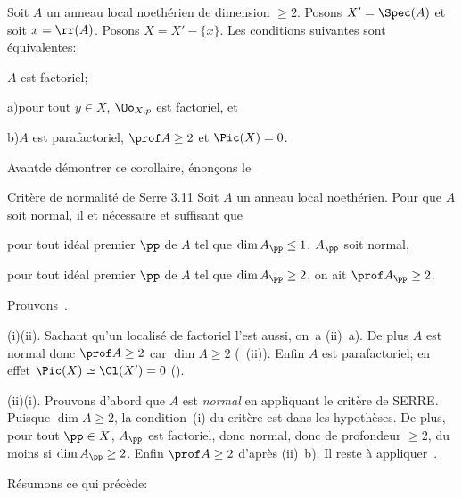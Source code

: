 \begin{corollaire} \label{XI.3.10}
Soit $A$ un anneau local noeth\'erien de dimension $\geq 2$. Posons $X'=\Spec(A)$ et soit $x = \rr(A)$. Posons $X=X'-\{x\}$. Les conditions suivantes sont \'equivalentes:
\begin{enumeratei}
\item
$A$ est factoriel;
\item
\textup{a)}\enspace pour tout $y\in X$, $\Oo_{X, p}$ est factoriel, et
\par\hspace*{6.3mm}\textup{b)}\enspace $A$ est parafactoriel, \ie $\prof A\geq 2$ et $\Pic(X)=0$.
\end{enumeratei}
\end{corollaire}

Avant\pageoriginale de d\'emontrer ce corollaire, \'enon\c cons le
\label{XI.3.11}
\begin{enonce*}{Crit\`ere de normalit\'e de Serre 3.11\sfootnotemark} Soit $A$ un anneau local noeth\'erien. Pour que $A$ soit normal, il et n\'ecessaire et suffisant que
\begin{enumeratei}
\item
pour tout id\'eal premier ${\pp}$ de $A$ tel que $\dim A_{{\pp}}\leq 1$, $A_{{\pp}}$ soit normal,
\item
pour tout id\'eal premier ${\pp}$ de $A$ tel que $\dim A_{{\pp}}\geq 2$, on ait $\prof A_{{\pp}}\geq 2$.
\end{enumeratei}
\end{enonce*}

Prouvons~.

(i)\ALORS (ii). Sachant qu'un localis\'e de factoriel l'est aussi, on~a (ii)~a). De plus $A$ est normal donc $\prof A\geq 2$ car $\dim A\geq 2$ (~(ii)). Enfin $A$ est parafactoriel; en effet $\Pic(X)\simeq\Cl(X')=0$ (\cf {}).

(ii)\ALORS (i). Prouvons d'abord que $A$ est \emph{normal} en appliquant le crit\`ere de SERRE. Puisque $\dim A\geq 2$, la condition~(i) du crit\`ere est dans les hypoth\`eses. De plus, pour tout ${\pp}\in X$, $A_{{\pp}}$ est factoriel, donc normal, donc de profondeur $\geq 2$, du moins si $\dim A_{{\pp}}\geq 2$. Enfin $\prof A\geq 2$ d'apr\`es (ii)~b). Il reste \`a appliquer~.

\smallskip
R\'esumons ce qui pr\'ec\`ede:

